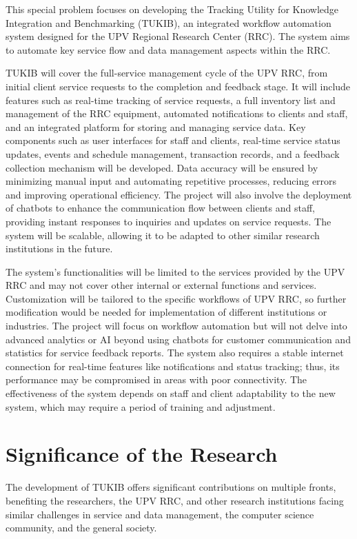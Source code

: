 This special problem focuses on developing the Tracking Utility for Knowledge Integration and Benchmarking (TUKIB), an integrated workflow automation system designed for the UPV Regional Research Center (RRC). The system aims to automate key service flow and data management aspects within the RRC. 

TUKIB will cover the full-service management cycle of the UPV RRC, from initial client service requests to the completion and feedback stage. It will include features such as real-time tracking of service requests, a full inventory list and management of the RRC equipment, automated notifications to clients and staff, and an integrated platform for storing and managing service data. Key components such as user interfaces for staff and clients, real-time service status updates, events and schedule management, transaction records,  and a feedback collection mechanism will be developed. Data accuracy will be ensured by minimizing manual input and automating repetitive processes, reducing errors and improving operational efficiency. The project will also involve the deployment of chatbots to enhance the communication flow between clients and staff, providing instant responses to inquiries and updates on service requests. The system will be scalable, allowing it to be adapted to other similar research institutions in the future.

The system’s functionalities will be limited to the services provided by the UPV RRC and may not cover other internal or external functions and services. Customization will be tailored to the specific workflows of UPV RRC, so further modification would be needed for implementation of different institutions or industries. The project will focus on workflow automation but will not delve into advanced analytics or AI beyond using chatbots for customer communication and statistics for service feedback reports. The system also requires a stable internet connection for real-time features like notifications and status tracking; thus, its performance may be compromised in areas with poor connectivity. The effectiveness of the system depends on staff and client adaptability to the new system, which may require a period of training and adjustment.

\section{Significance of the Research}
\label{sec:significance}

The development of TUKIB offers significant contributions on multiple fronts, benefiting the researchers, the UPV RRC, and other research institutions facing similar challenges in service and data management, the computer science community, and the general society.

